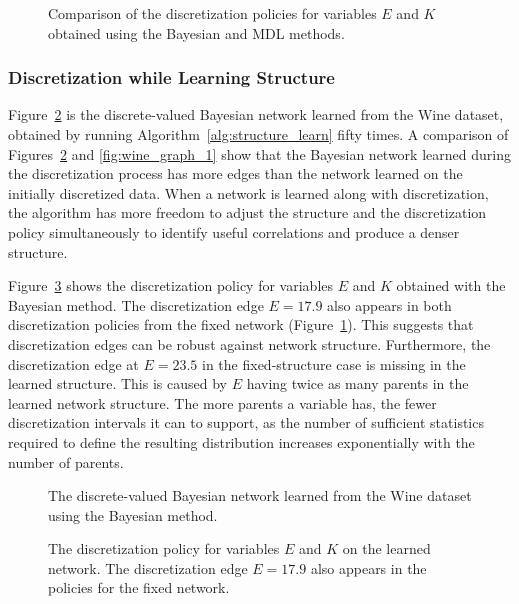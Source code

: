 \documentclass[twoside,11pt]{article}
\begin{document}
\begin{figure}[ht]
  \centering
  
  \caption{Comparison of the discretization policies for variables $E$ and $K$ obtained using the Bayesian and MDL methods.}
  \label{fig:wine_exp1_distr}
\end{figure}

\subsubsection{Discretization while Learning Structure}
\label{subsubsec:wine_exp2}

Figure~\ref{fig:wine_graph_2} is the discrete-valued Bayesian network learned from the Wine dataset, obtained by running Algorithm~\ref{alg:structure_learn} fifty times.
A comparison of Figures~\ref{fig:wine_graph_2} and \ref{fig:wine_graph_1} show that the Bayesian network learned during the discretization process has more edges than the network learned on the initially discretized data.
When a network is learned along with discretization, the algorithm has more freedom to adjust the structure and the discretization policy simultaneously to identify useful correlations and produce a denser structure.

Figure~\ref{fig:wine_exp2_distr} shows the discretization policy for variables $E$ and $K$ obtained with the Bayesian method.
The discretization edge $E = 17.9$ also appears in both discretization policies from the fixed network (Figure~\ref{fig:wine_exp1_distr}).
This suggests that discretization edges can be robust against network structure.
Furthermore, the discretization edge at $E = 23.5$ in the fixed-structure case is missing in the learned structure.
This is caused by $E$ having twice as many parents in the learned network structure.
The more parents a variable has, the fewer discretization intervals it can to support, as the number of sufficient statistics required to define the resulting distribution increases exponentially with the number of parents.

\begin{figure}[ht]
  \centering
  \scalebox{0.7}{}
  \caption{The discrete-valued Bayesian network learned from the Wine dataset using the Bayesian method.}
  \label{fig:wine_graph_2}
\end{figure}

\begin{figure}[ht]
  \centering
  
  \caption{
    The discretization policy for variables $E$ and $K$ on the learned network.
    The discretization edge $E = 17.9$ also appears in the policies for the fixed network.
  }
  \label{fig:wine_exp2_distr}
\end{figure}
%
%
\end{document}
